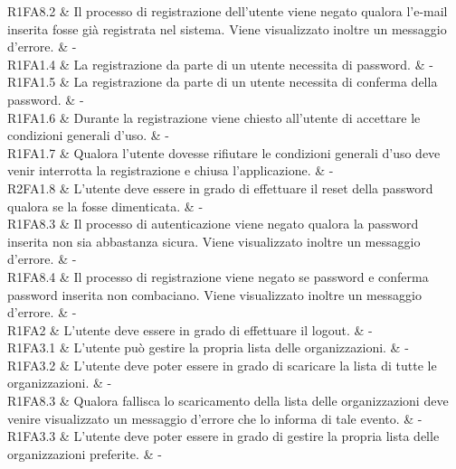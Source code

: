 R1FA8.2 & Il processo di registrazione dell'utente viene negato qualora l'e-mail inserita fosse già registrata nel sistema. Viene visualizzato inoltre un messaggio d'errore. & - \\

R1FA1.4 & La registrazione da parte di un utente necessita di password. & - \\

R1FA1.5 & La registrazione da parte di un utente necessita di conferma della password. & - \\

R1FA1.6 & Durante la registrazione viene chiesto all'utente di accettare le condizioni generali d'uso. & - \\

R1FA1.7 & Qualora l'utente dovesse rifiutare le condizioni generali d'uso deve venir interrotta la registrazione e chiusa l'applicazione. & - \\

R2FA1.8 & L'utente deve essere in grado di effettuare il reset della password qualora se la fosse dimenticata. & - \\

R1FA8.3 & Il processo di autenticazione viene negato qualora la password inserita non sia abbastanza sicura. Viene visualizzato inoltre un messaggio d'errore. & - \\

R1FA8.4 & Il processo di registrazione viene negato se password e conferma password inserita non combaciano. Viene visualizzato inoltre un messaggio d'errore. & - \\


R1FA2 & L'utente deve essere in grado di effettuare il logout. & - \\

R1FA3.1 & L'utente può gestire la propria lista delle organizzazioni. & - \\

R1FA3.2 & L'utente deve poter essere in grado di scaricare la lista di tutte le organizzazioni.  & - \\

R1FA8.3 & Qualora fallisca lo scaricamento della lista delle organizzazioni deve venire visualizzato un messaggio d'errore che lo informa di tale evento. & - \\

R1FA3.3 & L’utente deve poter essere in grado di gestire la propria lista delle organizzazioni preferite. & - \\

